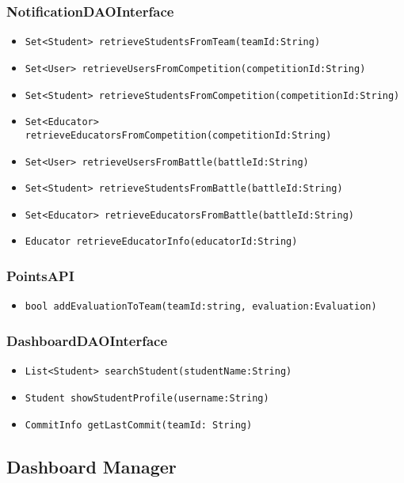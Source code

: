 \subsubsection{NotificationDAOInterface}
\begin{itemize}
    \item \texttt{Set<Student> retrieveStudentsFromTeam(teamId:String)}
    \item \texttt{Set<User> retrieveUsersFromCompetition(competitionId:String)}
    \item \texttt{Set<Student> retrieveStudentsFromCompetition(competitionId:String)}%
    \item \texttt{Set<Educator> retrieveEducatorsFromCompetition(competitionId:String)}
    \item \texttt{Set<User> retrieveUsersFromBattle(battleId:String)}
    \item \texttt{Set<Student> retrieveStudentsFromBattle(battleId:String)}
    \item \texttt{Set<Educator> retrieveEducatorsFromBattle(battleId:String)}
    \item \texttt{Educator retrieveEducatorInfo(educatorId:String)}%
\end{itemize}

\subsubsection{PointsAPI}
\begin{itemize}
    \item \texttt{bool addEvaluationToTeam(teamId:string, evaluation:Evaluation)}
\end{itemize}

\subsubsection{DashboardDAOInterface}
\begin{itemize}
    \item \texttt{List<Student> searchStudent(studentName:String)}%
    \item \texttt{Student showStudentProfile(username:String)}%
    \item \texttt{CommitInfo getLastCommit(teamId: String)}%
\end{itemize}

\subsection{Dashboard Manager}

